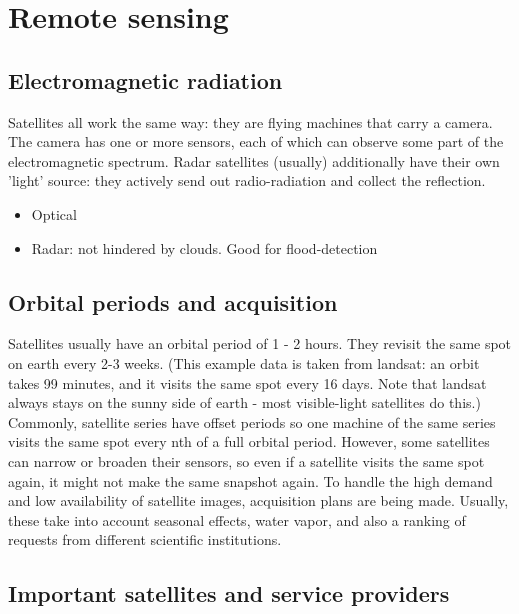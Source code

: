 \section{Remote sensing}


\subsection{Electromagnetic radiation}
Satellites all work the same way: they are flying machines that carry a camera. The camera has one or more sensors, each of which can observe some part of the electromagnetic spectrum.
Radar satellites (usually) additionally have their own 'light' source: they actively send out radio-radiation and collect the reflection.

\begin{itemize}
    \item Optical
    \item Radar: not hindered by clouds. Good for flood-detection
\end{itemize}





\subsection{Orbital periods and acquisition}
Satellites usually have an orbital period of 1 - 2 hours. They revisit the same spot on earth every 2-3 weeks.
(This example data is taken from landsat: an orbit takes 99 minutes, and it visits the same spot every 16 days.
Note that landsat always stays on the sunny side of earth - most visible-light satellites do this.)
Commonly, satellite series have offset periods so one machine of the same series visits the same spot every nth of a full orbital period.
However, some satellites can narrow or broaden their sensors, so even if a satellite visits the same spot again, it might not make the same snapshot again.
To handle the high demand and low availability of satellite images, acquisition plans are being made. Usually, these take into account seasonal effects,
water vapor, and also a ranking of requests from different scientific institutions.





\subsection{Important satellites and service providers}

